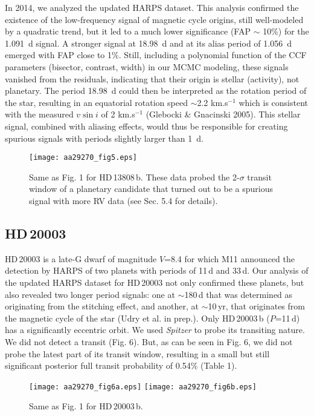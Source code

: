 \documentclass[traditabstract]{aa}
\begin{document}
In 2014, we analyzed the updated HARPS dataset. This analysis confirmed the existence of the low-frequency signal  of magnetic cycle origins, still well-modeled by a quadratic trend, but it led to a much lower significance (FAP $\sim$ 10\%) for the 1.091~d signal. A stronger signal at 18.98~d and at its alias period of 1.056~d emerged with FAP close to 1\%. Still, including a polynomial function of the CCF parameters (bisector, contrast, width) in our  MCMC modeling, these signals vanished from the residuals, indicating that their origin is stellar (activity), not planetary. The period 18.98~d could then be interpreted as the rotation period of the star, resulting in an equatorial rotation speed $\sim$2.2 km.s$^{-1}$ which is consistent with the measured $v\sin{i}$ of
 2 km.s$^{-1}$ (Glebocki \& Gnacinski 2005). This stellar signal, combined with aliasing effects, would thus be responsible for creating spurious signals with periods slightly larger than 1~d. 

\begin{figure}
\label{fig:5}
\centering                     
\texttt{[image: aa29270\_fig5.eps]}
\caption{Same as Fig. 1 for HD\,13808\,b. These data probed the 2-$\sigma$ transit window  of a planetary candidate that turned out to be a spurious signal with more RV data (see Sec. 5.4 for details). }
\end{figure} 

\subsection{HD\,20003}

HD\,20003 is a  late-G dwarf of magnitude $V$=8.4 for which M11 announced the detection by HARPS of two planets with periods of 11\,d and 33\,d.
Our analysis of the updated HARPS dataset for HD\,20003 not only confirmed these planets, but 
also revealed two longer period signals: one at $\sim$180\,d that was determined as originating from the stitching effect, and another, at $\sim$10\,yr, that originates from the magnetic cycle of the star (Udry et al. in prep.). 
Only HD\,20003\,b ($P$=11\,d) has a significantly eccentric orbit.  We used {\it Spitzer} to probe its transiting nature. We did not detect a transit (Fig. 6).  But, as can be seen in Fig. 6, we did not probe the latest part of its transit window, resulting in a small but still significant posterior full transit probability of 0.54\% (Table 1).

\begin{figure}
\label{fig:6}
\centering                     
\texttt{[image: aa29270\_fig6a.eps]}
\texttt{[image: aa29270\_fig6b.eps]}
\caption{Same as Fig. 1 for HD\,20003\,b.}
\end{figure}
\end{document}
